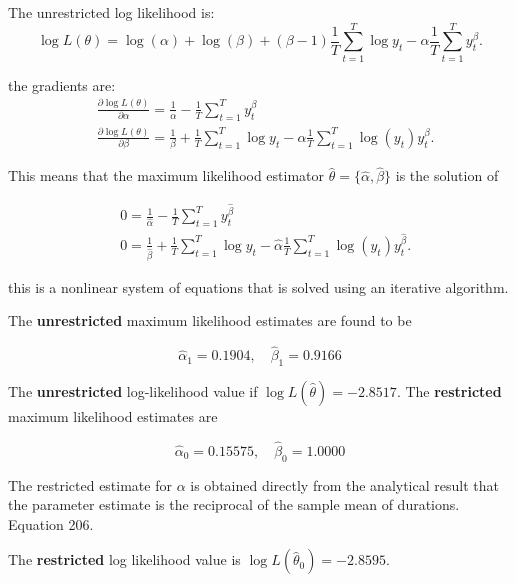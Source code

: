 \documentclass[11pt]{article}
\begin{document}
The unrestricted log likelihood is:
\begin{equation}
\log L(\theta)=\log (\alpha)+\log (\beta)+(\beta-1) \frac{1}{T} \sum_{t=1}^T \log y_t-\alpha \frac{1}{T} \sum_{t=1}^T y_t^\beta .
\end{equation}

the gradients are:
\begin{equation}
\begin{aligned}
& \frac{\partial \log L(\theta)}{\partial \alpha}=\frac{1}{\alpha}-\frac{1}{T} \sum_{t=1}^T y_t^\beta \\
& \frac{\partial \log L(\theta)}{\partial \beta}=\frac{1}{\beta}+\frac{1}{T} \sum_{t=1}^T \log y_t-\alpha \frac{1}{T} \sum_{t=1}^T \log \left(y_t\right) y_t^\beta .
\end{aligned}
\end{equation}

This means that the maximum likelihood estimator $\hat{\theta} = \{\hat{\alpha}, \hat{\beta}\}$ is the solution of

\begin{equation}
\begin{aligned}
& 0=\frac{1}{\widehat{\alpha}}-\frac{1}{T} \sum_{t=1}^T y_t^{\widehat{\beta}} \\
& 0=\frac{1}{\widehat{\beta}}+\frac{1}{T} \sum_{t=1}^T \log y_t-\widehat{\alpha} \frac{1}{T} \sum_{t=1}^T \log \left(y_t\right) y_t^{\widehat{\beta}} .
\end{aligned}
\end{equation}

this is a nonlinear system of equations that is solved using an iterative algorithm.

The \textbf{unrestricted} maximum likelihood estimates are found to be

\[\widehat{\alpha}_1=0.1904, \quad \widehat{\beta}_1=0.9166\]

The \textbf{unrestricted} log-likelihood value if $\log L(\hat{\theta}) = -2.8517$. The \textbf{restricted} maximum likelihood estimates are

\[\widehat{\alpha}_0=0.15575, \quad \widehat{\beta}_0=1.0000\]

\begin{note}
    The restricted estimate for $\alpha$ is obtained directly from the analytical result that the parameter estimate is the reciprocal of the sample mean of durations. Equation 206.
\end{note}

The \textbf{restricted} log likelihood value is $\log L(\hat{\theta}_0)=-2.8595$.
\end{document}
